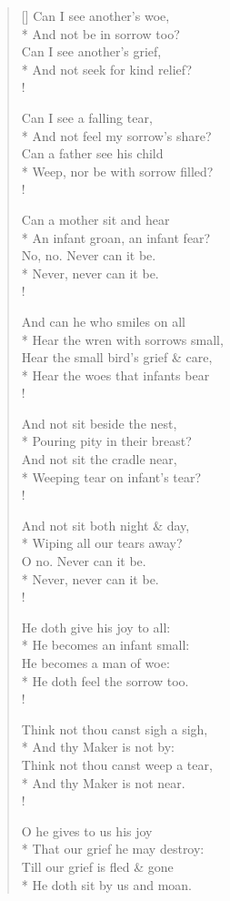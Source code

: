 \documentclass[MAIN]{subfiles}
\begin{document}
\settowidth{\versewidth}{And not seek for kind relief?}
\begin{verse}[\versewidth]
Can I see another's woe,\\*
And not be in sorrow too?\\
Can I see another's grief,\\*
And not seek for kind relief?\\!

Can I see a falling tear,\\*
And not feel my sorrow's share?\\
Can a father see his child\\*
Weep, nor be with sorrow filled?\\!

Can a mother sit and hear\\*
An infant groan, an infant fear?\\
No, no. Never can it be.\\*
Never, never can it be.\\!

And can he who smiles on all\\*
Hear the wren with sorrows small,\\
Hear the small bird's grief \& care,\\*
Hear the woes that infants bear\\!

And not sit beside the nest,\\*
Pouring pity in their breast?\\
And not sit the cradle near,\\*
Weeping tear on infant's tear?\\!

And not sit both night \& day,\\*
Wiping all our tears away?\\
O no. Never can it be.\\*
Never, never can it be.\\!

He doth give his joy to all:\\*
He becomes an infant small:\\
He becomes a man of woe:\\*
He doth feel the sorrow too.\\!

Think not thou canst sigh a sigh,\\*
And thy Maker is not by:\\
Think not thou canst weep a tear,\\*
And thy Maker is not near.\\!

O he gives to us his joy\\*
That our grief he may destroy:\\
Till our grief is fled \& gone\\*
He doth sit by us and moan.
\end{verse}
\end{document}
